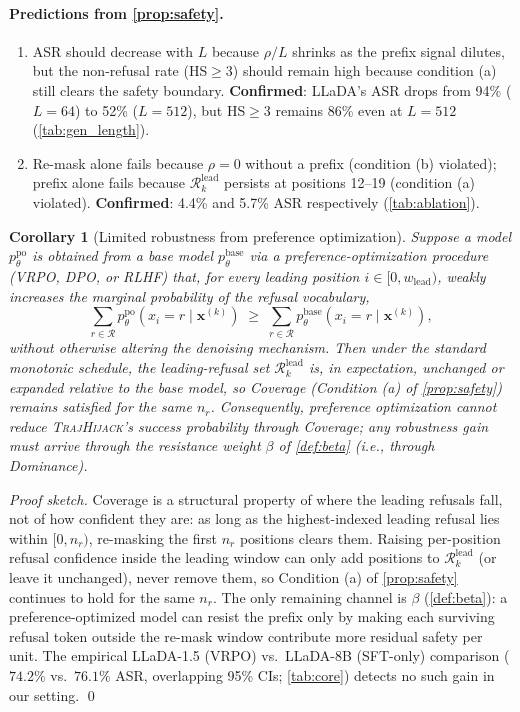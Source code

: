 \documentclass{article}
\theoremstyle{coloredthm}
\newtheorem{corollary}{Corollary}
\newcommand{\method}{\textsc{TrajHijack}}
\begin{document}
\paragraph{Predictions from \cref{prop:safety}.}
\begin{enumerate}
    \item[\textbf{P1.}] ASR should decrease with $L$ because $\rho/L$ shrinks as the prefix signal dilutes, but the non-refusal rate (HS$\geq$3) should remain high because condition (a) still clears the safety boundary. \textbf{Confirmed}: LLaDA's ASR drops from 94\% ($L{=}64$) to 52\% ($L{=}512$), but HS$\geq$3 remains 86\% even at $L{=}512$ (\cref{tab:gen_length}).
    \item[\textbf{P2.}] Re-mask alone fails because $\rho{=}0$ without a prefix (condition (b) violated); prefix alone fails because $\mathcal{R}^{\text{lead}}_k$ persists at positions 12--19 (condition (a) violated). \textbf{Confirmed}: 4.4\% and 5.7\% ASR respectively (\cref{tab:ablation}).
\end{enumerate}

\begin{corollary}[Limited robustness from preference optimization]
\label{cor:vrpo}
Suppose a model $p^{\text{po}}_\theta$ is obtained from a base model $p^{\text{base}}_\theta$ via a preference-optimization procedure (VRPO, DPO, or RLHF) that, for every leading position $i \in [0, w_{\text{lead}})$, weakly increases the marginal probability of the refusal vocabulary,
\begin{equation}
\sum_{r \in \mathcal{R}} p^{\text{po}}_\theta(x_i = r \mid \mathbf{x}^{(k)}) \;\geq\; \sum_{r \in \mathcal{R}} p^{\text{base}}_\theta(x_i = r \mid \mathbf{x}^{(k)}),
\end{equation}
without otherwise altering the denoising mechanism. Then under the standard monotonic schedule, the leading-refusal set $\mathcal{R}^{\text{lead}}_k$ is, in expectation, unchanged or expanded relative to the base model, so Coverage (Condition (a) of \cref{prop:safety}) remains satisfied for the same $n_r$. Consequently, preference optimization cannot reduce \method{}'s success probability through Coverage; any robustness gain must arrive through the resistance weight $\beta$ of \cref{def:beta} (i.e., through Dominance).
\end{corollary}

\textit{Proof sketch.} Coverage is a structural property of where the leading refusals fall, not of how confident they are: as long as the highest-indexed leading refusal lies within $[0, n_r)$, re-masking the first $n_r$ positions clears them. Raising per-position refusal confidence inside the leading window can only add positions to $\mathcal{R}^{\text{lead}}_k$ (or leave it unchanged), never remove them, so Condition (a) of \cref{prop:safety} continues to hold for the same $n_r$. The only remaining channel is $\beta$ (\cref{def:beta}): a preference-optimized model can resist the prefix only by making each surviving refusal token outside the re-mask window contribute more residual safety per unit. The empirical LLaDA-1.5 (VRPO) vs.\ LLaDA-8B (SFT-only) comparison ($74.2\%$ vs.\ $76.1\%$ ASR, overlapping 95\% CIs; \cref{tab:core}) detects no such gain in our setting. \qed
\end{document}
